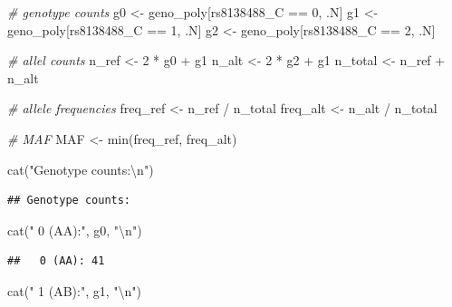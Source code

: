 \documentclass[
]{article}
\newenvironment{Shaded}{\begin{snugshade}}{\end{snugshade}}
\newcommand{\CommentTok}[1]{\textcolor[rgb]{0.56,0.35,0.01}{\textit{#1}}}
\newcommand{\DecValTok}[1]{\textcolor[rgb]{0.00,0.00,0.81}{#1}}
\newcommand{\FunctionTok}[1]{\textcolor[rgb]{0.00,0.00,0.00}{#1}}
\newcommand{\NormalTok}[1]{#1}
\newcommand{\OtherTok}[1]{\textcolor[rgb]{0.56,0.35,0.01}{#1}}
\newcommand{\SpecialCharTok}[1]{\textcolor[rgb]{0.00,0.00,0.00}{#1}}
\newcommand{\StringTok}[1]{\textcolor[rgb]{0.31,0.60,0.02}{#1}}
\begin{document}
\begin{Shaded}
\begin{Highlighting}[]
\CommentTok{\# genotype counts}
\NormalTok{g0 }\OtherTok{\textless{}{-}}\NormalTok{ geno\_poly[rs8138488\_C }\SpecialCharTok{==} \DecValTok{0}\NormalTok{, .N]}
\NormalTok{g1 }\OtherTok{\textless{}{-}}\NormalTok{ geno\_poly[rs8138488\_C }\SpecialCharTok{==} \DecValTok{1}\NormalTok{, .N]}
\NormalTok{g2 }\OtherTok{\textless{}{-}}\NormalTok{ geno\_poly[rs8138488\_C }\SpecialCharTok{==} \DecValTok{2}\NormalTok{, .N]}

\CommentTok{\# allel counts}
\NormalTok{n\_ref }\OtherTok{\textless{}{-}} \DecValTok{2} \SpecialCharTok{*}\NormalTok{ g0 }\SpecialCharTok{+}\NormalTok{ g1}
\NormalTok{n\_alt }\OtherTok{\textless{}{-}} \DecValTok{2} \SpecialCharTok{*}\NormalTok{ g2 }\SpecialCharTok{+}\NormalTok{ g1}
\NormalTok{n\_total }\OtherTok{\textless{}{-}}\NormalTok{ n\_ref }\SpecialCharTok{+}\NormalTok{ n\_alt}

\CommentTok{\# allele frequencies}
\NormalTok{freq\_ref }\OtherTok{\textless{}{-}}\NormalTok{ n\_ref }\SpecialCharTok{/}\NormalTok{ n\_total}
\NormalTok{freq\_alt }\OtherTok{\textless{}{-}}\NormalTok{ n\_alt }\SpecialCharTok{/}\NormalTok{ n\_total}

\CommentTok{\# MAF}
\NormalTok{MAF }\OtherTok{\textless{}{-}} \FunctionTok{min}\NormalTok{(freq\_ref, freq\_alt)}

\FunctionTok{cat}\NormalTok{(}\StringTok{"Genotype counts:}\SpecialCharTok{\textbackslash{}n}\StringTok{"}\NormalTok{)}
\end{Highlighting}
\end{Shaded}

\begin{verbatim}
## Genotype counts:
\end{verbatim}

\begin{Shaded}
\begin{Highlighting}[]
\FunctionTok{cat}\NormalTok{(}\StringTok{"  0 (AA):"}\NormalTok{, g0, }\StringTok{"}\SpecialCharTok{\textbackslash{}n}\StringTok{"}\NormalTok{)}
\end{Highlighting}
\end{Shaded}

\begin{verbatim}
##   0 (AA): 41
\end{verbatim}

\begin{Shaded}
\begin{Highlighting}[]
\FunctionTok{cat}\NormalTok{(}\StringTok{"  1 (AB):"}\NormalTok{, g1, }\StringTok{"}\SpecialCharTok{\textbackslash{}n}\StringTok{"}\NormalTok{)}
\end{Highlighting}
\end{Shaded}
\end{document}
